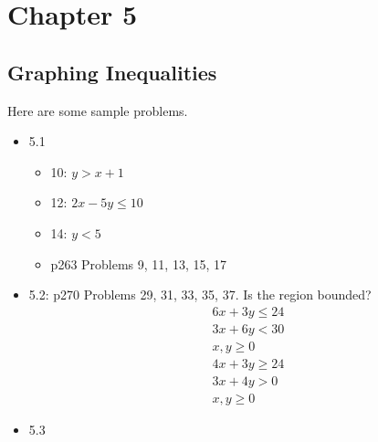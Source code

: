 \documentclass[12pt]{article}
\begin{document}
\section*{Chapter 5}

\subsection*{Graphing Inequalities}
Here are some sample problems.
\begin{itemize}
	\item 5.1
	\begin{itemize}
		\item 10: $y > x+1$
		\item 12: $2x-5y \leq10$
		\item 14: $y<5$
		\item p263 Problems 9, 11, 13, 15, 17
	\end{itemize}

	\item 5.2: p270 Problems 29, 31, 33, 35, 37. Is the region bounded?
	\begin{align*}
		6x+3y\leq 24 \tag{\#32}\\
		3x+6y < 30 \\
		x,y \geq 0
	\end{align*}
	\begin{align*}
		4x+3y\geq 24 \tag{\#34}\\
		3x+4y > 0 \\
		x,y \geq 0
	\end{align*}


\item 5.3
\begin{itemize}


\end{itemize}
\end{itemize}
\end{document}
